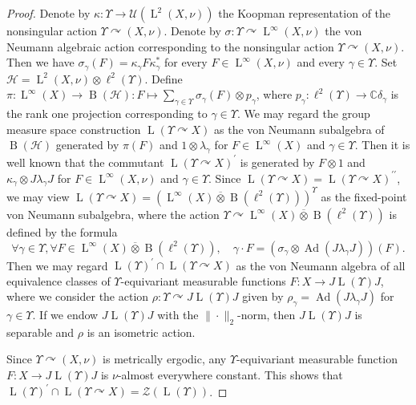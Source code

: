 \documentclass[11pt]{amsart}
\numberwithin{equation}{section}
\theoremstyle{plain}
\theoremstyle{definition}
\newcommand{\C}{\mathbb{C}}
\newcommand{\ovt}{\mathbin{\overline{\otimes}}}
\newcommand{\Ad}{\operatorname{Ad}}
\newcommand{\dpr}{^{\prime\prime}}
\newcommand{\rB}{\operatorname{B}}
\newcommand{\rL}{\operatorname{ L}}
\begin{document}
\begin{proof}
Denote by $\kappa : \Upsilon \to \mathscr U(\rL^2(X, \nu))$ the Koopman representation of the nonsingular action $\Upsilon \curvearrowright (X, \nu)$. Denote by $\sigma : \Upsilon \curvearrowright \rL^\infty(X, \nu)$ the von Neumann algebraic action corresponding to the nonsingular action $\Upsilon \curvearrowright (X, \nu)$. Then we have $\sigma_\gamma(F) = \kappa_\gamma F \kappa_\gamma^*$ for every $F \in \rL^\infty(X, \nu)$ and every $\gamma \in \Upsilon$. Set $\mathscr H = \rL^2(X, \nu) \otimes \ell^2(\Upsilon)$. Define $\pi : \rL^\infty(X) \to \rB(\mathscr H) : F \mapsto \sum_{\gamma \in \Upsilon} \sigma_\gamma(F) \otimes p_\gamma$, where $p_\gamma : \ell^2(\Upsilon) \to \C \delta_\gamma$ is the rank one projection corresponding to $\gamma \in \Upsilon$. We may regard the group measure space construction $\rL(\Upsilon \curvearrowright X)$ as the von Neumann subalgebra of $\rB(\mathscr H)$ generated by $\pi(F)$ and $1 \otimes \lambda_\gamma$ for $F \in \rL^\infty(X)$ and $\gamma \in \Upsilon$. Then it is well known that the commutant $\rL(\Upsilon \curvearrowright X)^\prime$ is generated by $F \otimes 1$ and $\kappa_\gamma \otimes J\lambda_\gamma J$ for $F \in \rL^\infty(X, \nu)$ and $\gamma \in \Upsilon$. Since $\rL(\Upsilon \curvearrowright X) = \rL(\Upsilon \curvearrowright X)\dpr$, we may view $\rL(\Upsilon \curvearrowright X) = (\rL^\infty(X) \ovt \rB(\ell^2(\Upsilon)))^\Upsilon$ as the fixed-point von Neumann subalgebra, where the action $\Upsilon \curvearrowright \rL^\infty(X) \ovt \rB(\ell^2(\Upsilon))$ is defined by the formula
$$\forall \gamma \in \Upsilon, \forall F \in \rL^\infty(X) \ovt \rB(\ell^2(\Upsilon)), \quad \gamma \cdot F = \left(\sigma_\gamma \otimes \Ad(J \lambda_\gamma J) \right)(F).$$
Then we may regard $\rL(\Upsilon)^\prime \cap \rL(\Upsilon \curvearrowright X)$ as the von Neumann algebra of all equivalence classes of $\Upsilon$-equivariant measurable functions $F : X \to J \rL(\Upsilon) J$, where we consider the action $\rho : \Upsilon \curvearrowright J \rL(\Upsilon) J$ given by $\rho_\gamma=\Ad(J\lambda_\gamma J)$ for $\gamma \in \Upsilon$. If we endow $J \rL(\Upsilon) J$ with the $\|\cdot\|_2$-norm, then $J \rL(\Upsilon) J$ is separable and $\rho$ is an isometric action. 

Since $\Upsilon \curvearrowright (X, \nu)$ is metrically ergodic, any $\Upsilon$-equivariant measurable function $F : X \to J \rL(\Upsilon) J$ is $\nu$-almost everywhere constant. This shows that $\rL(\Upsilon)^\prime \cap \rL(\Upsilon \curvearrowright X) = \mathscr Z(\rL(\Upsilon))$.
\end{proof}
\end{document}
